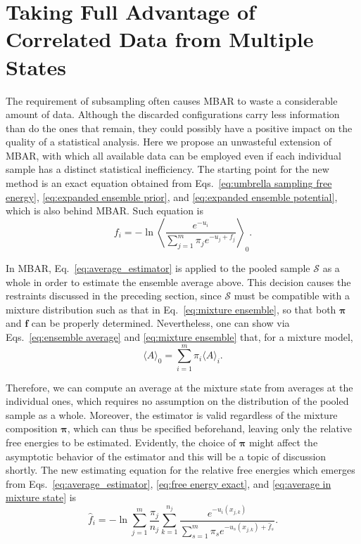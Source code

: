 \documentclass[aip,jcp,reprint,amsmath,amssymb]{revtex4-1}
\newcommand{\vt}[1]{\boldsymbol{\mathbf{#1}}}           %
\begin{document}
\section{Taking Full Advantage of Correlated Data from Multiple States}

The requirement of subsampling often causes MBAR to waste a considerable amount of data. Although the discarded configurations carry less information than do the ones that remain, they could possibly have a positive impact on the quality of a statistical analysis. Here we propose an unwasteful extension of MBAR, with which all available data can be employed even if each individual sample has a distinct statistical inefficiency. The starting point for the new method is an exact equation obtained from Eqs.~\eqref{eq:umbrella sampling free energy}, \eqref{eq:expanded ensemble prior}, and \eqref{eq:expanded ensemble potential}, which is also behind MBAR. Such equation is
\begin{equation}
\label{eq:free energy exact}
f_i = -\ln \left\langle \frac{e^{-u_i}}{\sum_{j=1}^m \pi_j e^{-u_j + f_j}} \right\rangle_0.
\end{equation}

In MBAR, Eq.~\eqref{eq:average_estimator} is applied to the pooled sample $\mathcal S$ as a whole in order to estimate the ensemble average above. This decision causes the restraints discussed in the preceding section, since $\mathcal S$ must be compatible with a mixture distribution such as that in Eq.~\eqref{eq:mixture ensemble}, so that both $\vt \pi$ and $\vt f$ can be properly determined. Nevertheless, one can show via Eqs.~\eqref{eq:ensemble average} and \eqref{eq:mixture ensemble} that, for a mixture model,
\begin{equation}
\label{eq:average in mixture state}
\langle A \rangle_0 = \sum_{i=1}^m \pi_i \langle A \rangle_i.
\end{equation}

Therefore, we can compute an average at the mixture state from averages at the individual ones, which requires no assumption on the distribution of the pooled sample as a whole. Moreover, the estimator is valid regardless of the mixture composition $\vt \pi$, which can thus be specified beforehand, leaving only the relative free energies to be estimated. Evidently, the choice of $\vt \pi$ might affect the asymptotic behavior of the estimator and this will be a topic of discussion shortly. The new estimating equation for the relative free energies which emerges from Eqs.~\eqref{eq:average_estimator}, \eqref{eq:free energy exact}, and \eqref{eq:average in mixture state} is
\begin{equation}
\label{eq:mblock free energy estimator}
{\hat f}_i = -\ln \sum_{j=1}^m \frac{\pi_j}{n_j} \sum_{k=1}^{n_j} \frac{e^{-u_i(x_{j,k})}}{\sum_{s=1}^m \pi_s e^{-u_s(x_{j,k}) + {\hat f}_s}}.
\end{equation}
\end{document}
